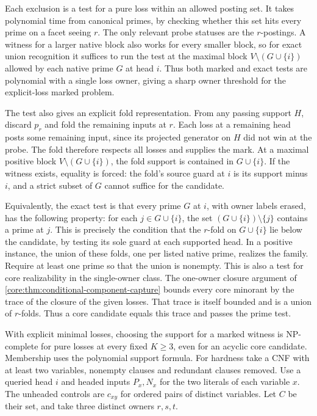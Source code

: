 Each exclusion is a test for a pure loss within an allowed
posting set. It takes polynomial time from canonical
primes, by checking whether this set hits every prime on
a facet seeing $r$. The only relevant probe statuses are
the $r$-postings. A witness for a larger native block also
works for every smaller block, so for exact union
recognition it suffices to run the test at the maximal
block $V\setminus(G\cup\{i\})$ allowed by each native
prime $G$ at head $i$. Thus both marked and exact tests
are polynomial with a single loss owner, giving a sharp
owner threshold for the explicit-loss marked problem.

The test also gives an explicit fold representation. From
any passing support $H$, discard $p_r$ and fold the remaining
inputs at $r$. Each loss at a remaining head posts some
remaining input, since its projected generator on $H$ did
not win at the probe. The fold therefore respects all losses
and supplies the mark. At a maximal positive block
$V\setminus(G\cup\{i\})$, the fold support is contained
in $G\cup\{i\}$. If the witness exists, equality is forced:
the fold's source guard at $i$ is its support minus $i$,
and a strict subset of $G$ cannot suffice for the candidate.

Equivalently, the exact test is that every prime $G$ at
$i$, with owner labels erased, has the following property:
for each $j\in G\cup\{i\}$, the set
$(G\cup\{i\})\setminus\{j\}$ contains a prime at $j$.
This is precisely the condition that the $r$-fold on
$G\cup\{i\}$ lie below the candidate, by testing its
sole guard at each supported head. In a positive instance,
the union of these folds, one per listed native prime,
realizes the family. Require at least one prime so that
the union is nonempty.
This is also a test for core realizability in the single-owner
class. The one-owner closure argument of
\cref{core:thm:conditional-component-capture} bounds every core
minorant by the trace of the closure of the given losses.
That trace is itself bounded and is a union of $r$-folds.
Thus a core candidate equals this trace and passes the prime test.

With explicit minimal losses, choosing the support for a
marked witness is NP-complete for pure losses at every fixed
$K\ge3$, even for an acyclic core candidate. Membership uses
the polynomial support formula. For hardness take a CNF with
at least two variables, nonempty clauses and redundant clauses
removed. Use a queried head $i$ and headed inputs $P_x,N_x$
for the two literals of each variable $x$. The unheaded
controls are $c_{xy}$ for ordered pairs of distinct variables.
Let $C$ be their set, and take three distinct owners $r,s,t$.

